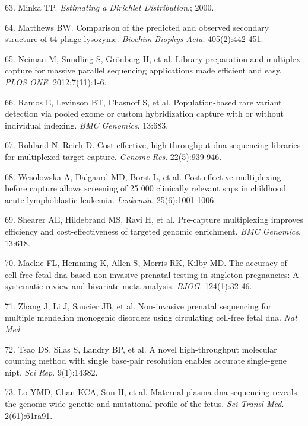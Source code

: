 \documentclass[11pt,letterpaper]{book}
\begin{document}
\leavevmode\hypertarget{ref-minka:2000aa}{}%
63. Minka TP. \emph{Estimating a Dirichlet Distribution}.; 2000.

\leavevmode\hypertarget{ref-matthews:1975aa}{}%
64. Matthews BW. Comparison of the predicted and observed secondary structure of t4 phage lysozyme. \emph{Biochim Biophys Acta}. 405(2):442-451.

\leavevmode\hypertarget{ref-neiman:2012aa}{}%
65. Neiman M, Sundling S, Grönberg H, et al. Library preparation and multiplex capture for massive parallel sequencing applications made efficient and easy. \emph{PLOS ONE}. 2012;7(11):1-6.

\leavevmode\hypertarget{ref-ramos:2012aa}{}%
66. Ramos E, Levinson BT, Chasnoff S, et al. Population-based rare variant detection via pooled exome or custom hybridization capture with or without individual indexing. \emph{BMC Genomics}. 13:683.

\leavevmode\hypertarget{ref-rohland:2012aa}{}%
67. Rohland N, Reich D. Cost-effective, high-throughput dna sequencing libraries for multiplexed target capture. \emph{Genome Res}. 22(5):939-946.

\leavevmode\hypertarget{ref-wesolowska:2011aa}{}%
68. Wesolowska A, Dalgaard MD, Borst L, et al. Cost-effective multiplexing before capture allows screening of 25 000 clinically relevant snps in childhood acute lymphoblastic leukemia. \emph{Leukemia}. 25(6):1001-1006.

\leavevmode\hypertarget{ref-shearer:2012aa}{}%
69. Shearer AE, Hildebrand MS, Ravi H, et al. Pre-capture multiplexing improves efficiency and cost-effectiveness of targeted genomic enrichment. \emph{BMC Genomics}. 13:618.

\leavevmode\hypertarget{ref-mackie:2017aa}{}%
70. Mackie FL, Hemming K, Allen S, Morris RK, Kilby MD. The accuracy of cell-free fetal dna-based non-invasive prenatal testing in singleton pregnancies: A systematic review and bivariate meta-analysis. \emph{BJOG}. 124(1):32-46.

\leavevmode\hypertarget{ref-zhang:2019aa}{}%
71. Zhang J, Li J, Saucier JB, et al. Non-invasive prenatal sequencing for multiple mendelian monogenic disorders using circulating cell-free fetal dna. \emph{Nat Med}.

\leavevmode\hypertarget{ref-tsao:2019ab}{}%
72. Tsao DS, Silas S, Landry BP, et al. A novel high-throughput molecular counting method with single base-pair resolution enables accurate single-gene nipt. \emph{Sci Rep}. 9(1):14382.

\leavevmode\hypertarget{ref-lo:2010aa}{}%
73. Lo YMD, Chan KCA, Sun H, et al. Maternal plasma dna sequencing reveals the genome-wide genetic and mutational profile of the fetus. \emph{Sci Transl Med}. 2(61):61ra91.
\end{document}
